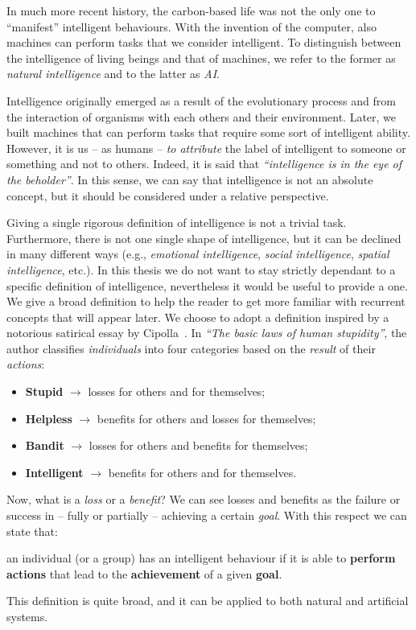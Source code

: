 In much more recent history, the carbon-based life was not the only one to ``manifest'' intelligent behaviours.
%
With the invention of the computer, also machines can perform tasks that we consider intelligent.
%
To distinguish between the intelligence of living beings and that of machines, we refer to the former as \emph{natural intelligence} and to the latter as \emph{\gls{AI}}.


Intelligence originally emerged as a result of the evolutionary process and from the interaction of organisms with each others and their environment.
%
Later, we built machines that can perform tasks that require some sort of intelligent ability.
%
However, it is us -- as humans -- \emph{to attribute} the label of intelligent to someone or something and not to others.
%
Indeed, it is said that \emph{``intelligence is in the eye of the beholder''}.
%
In this sense, we can say that intelligence is not an absolute concept, but it should be considered under a relative perspective.


Giving a single rigorous definition of intelligence is not a trivial task.
%
Furthermore, there is not one single shape of intelligence, but it can be declined in many different ways (e.g., \emph{emotional intelligence}, \emph{social intelligence}, \emph{spatial intelligence}, etc.).
%
In this thesis we do not want to stay strictly dependant to a specific definition of intelligence, nevertheless it would be useful to provide a one.
%
We give a broad definition to help the reader to get more familiar with recurrent concepts that will appear later.
%
We choose to adopt a definition inspired by a notorious satirical essay by Cipolla~\cite{cipolla2013allegro}.
%
In \emph{``The basic laws of human stupidity''}, the author classifies \emph{individuals} into four categories based on the \emph{result} of their \emph{actions}:
%
\begin{itemize}
    \item \textbf{Stupid} $\rightarrow$ losses for others and for themselves;
    \item \textbf{Helpless} $\rightarrow$ benefits for others and losses for themselves;
    \item \textbf{Bandit} $\rightarrow$ losses for others and benefits for themselves;
    \item \textbf{Intelligent} $\rightarrow$ benefits for others and for themselves.
\end{itemize}
%
Now, what is a \emph{loss} or a \emph{benefit}?
%
We can see losses and benefits as the failure or success in -- fully or partially -- achieving a certain \emph{goal}.
%
With this respect we can state that:
%
\begin{definition}[Intelligence]
    \label{def:intelligence}
    an individual (or a group) has an intelligent behaviour if it is able to \textbf{perform actions} that lead to the \textbf{achievement} of a given \textbf{goal}.
\end{definition}
%
This definition is quite broad, and it can be applied to both natural and artificial systems.


